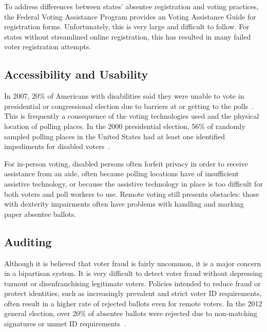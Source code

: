 To address differences between states' absentee registration and
voting practices, the Federal Voting Assistance Program provides an
Voting Assistance Guide for registration forms. Unfortunately, this is
very large and difficult to follow. For states without streamlined
online registration, this has resulted in many failed voter
registration attempts.



\subsection{Accessibility and Usability}

In 2007, 20\% of Americans with disabilities said they were unable to
vote in presidential or congressional election due to barriers at or
getting to the polls~\cite{runyan2007improving}. This is frequently a
consequence of the voting technologies used and the physical location
of polling places. In the 2000 presidential election, 56\% of randomly
sampled polling places in the United States had at least one
identified impediments for disabled voters~\cite{united2001voters}.

For in-person voting, disabled persons often forfeit privacy in order
to receive assistance from an aide, often because polling locations
have of insufficient assistive technology, or because the assistive
technology in place is too difficult for both voters and poll workers
to use. Remote voting still presents obstacles: those with dexterity
impairments often have problems with handling and marking paper
absentee ballots.

\subsection{Auditing}

Although it is believed that voter fraud is fairly uncommon, it is a
major concern in a bipartisan system. It is very difficult to detect
voter fraud without depressing turnout or disenfranchising legitimate
voters. Policies intended to reduce fraud or protect identities, such
as increasingly prevalent and strict voter ID requirements, often
result in a higher rate of rejected ballots even for remote voters. In
the 2012 general election, over 20\% of absentee ballots were rejected
due to non-matching signatures or unmet ID
requirements~\cite{eac2012survey}.

